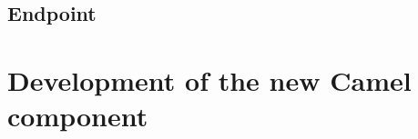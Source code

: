 \documentclass[12pt,final,oneside]{fithesis2}
\begin{document}
\subsection*{Endpoint}
 
\section{Development of the new Camel component}\label{component-devel}

%
\end{document}
